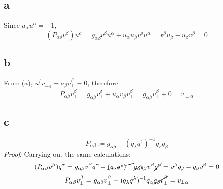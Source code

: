 \documentclass{article}
\begin{document}
\section{}
\subsection*{a}
Since $u_\alpha u^\alpha  = -1$,
\[
	(P_{\alpha\beta}v^\beta) u^\alpha = g_{\alpha\beta} v^\beta u^\alpha +  u_{\alpha}u_{\beta} v^\beta u^\alpha
	= v^\beta u_\beta - u_\beta v^\beta = 0
\]
\subsection*{b}
From (a), $u^\beta v_{\perp_\beta} = u_{\beta} v_{\perp}^\beta = 0$, therefore
\[
	P_{\alpha\beta}v_{\perp}^\beta =  g_{\alpha\beta} v_{\perp}^\beta +  u_{\alpha}u_{\beta} v_{\perp}^\beta
	=  g_{\alpha\beta} v_{\perp}^\beta +  0 = v_{\perp\alpha}
\]
\subsection*{c}
\[
	P_{\alpha\beta} := g_{\alpha\beta}  - ({q_\lambda q^\lambda})^{-1} q_{\alpha}q_{\beta}
\]
\textit{Proof:} Carrying out the same calculations:
\[  (P_{\alpha\beta}v^\beta) q^\alpha = g_{\alpha\beta} v^\beta q^\alpha - \cancel{({q_\lambda q^\lambda})^{-1}} \cancel{q_{\alpha}}q_{\beta} v^\beta \cancel{q^\alpha} = v^\beta q_\beta - q_\beta v^\beta = 0 \]
\[
	P_{\alpha\beta}v_{\perp}^\beta =  g_{\alpha\beta} v_{\perp}^\beta  - ({q_\lambda q^\lambda})^{-1} q_{\alpha}\cancel{q_{\beta}  v_{\perp}^\beta} = v_{\perp\alpha}
\]
\end{document}
